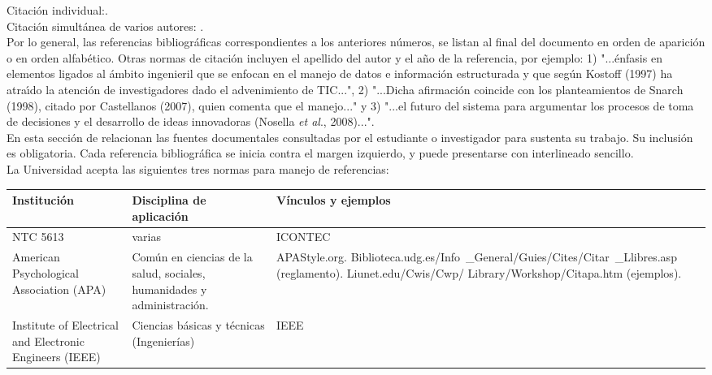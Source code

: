Citaci\'{o}n individual:\cite{AG01}.\\
Citaci\'{o}n simult\'{a}nea de varios autores:
\cite{AG12,AG52,AG70,AG08a,AG09a,AG36a,AG01i}.\\

Por lo general, las referencias bibliogr\'{a}ficas correspondientes a los anteriores n\'{u}meros, se listan al final del documento en orden de aparici\'{o}n o en orden alfab\'{e}tico. Otras normas de citaci\'{o}n incluyen el apellido del autor y el a\~{n}o de la referencia, por ejemplo: 1) "...\'{e}nfasis en elementos ligados al \'{a}mbito ingenieril que se enfocan en el manejo de datos e informaci\'{o}n estructurada y que seg\'{u}n Kostoff (1997) ha atra\'{\i}do la atenci\'{o}n de investigadores dado el advenimiento de TIC...", 2) "...Dicha afirmaci\'{o}n coincide con los planteamientos de Snarch (1998), citado por Castellanos (2007), quien comenta que el manejo..." y 3) "...el futuro del sistema para argumentar los procesos de toma de decisiones y el desarrollo de ideas innovadoras (Nosella \textsl{et al}., 2008)...".\\


En esta sección de relacionan las fuentes documentales consultadas por el estudiante o investigador para sustenta su trabajo. Su inclusión es obligatoria. Cada referencia bibliográfica se inicia contra el margen izquierdo, y puede presentarse con interlineado sencillo. \\

La Universidad acepta las siguientes tres normas para manejo de referencias: 

\begin{center}
\begin{table}[H]
\centering
\begin{tabular}{|p{2cm}|p{3cm}|p{6cm}|}
\hline
Institución	&	Disciplina de aplicación	& Vínculos y ejemplos \\ 
\hline
NTC 5613	&	varias	&	ICONTEC	\\ 
\hline
American Psychological Association (APA)                   & Común en ciencias de la salud, sociales, humanidades y administración. & APAStyle.org.
\hspace{0.1cm}
Biblioteca.udg.es/Info\ \_General/Guies/Cites/Citar\ 
\_Llibres.asp (reglamento). 
Liunet.edu/Cwis/Cwp/
Library/Workshop/Citapa.htm (ejemplos).  \\ 
\hline
Institute of Electrical and Electronic Engineers (IEEE) & Ciencias
básicas y técnicas (Ingenierías)	& IEEE	\\
\hline
\end{tabular}
\end{table}
\end{center}


